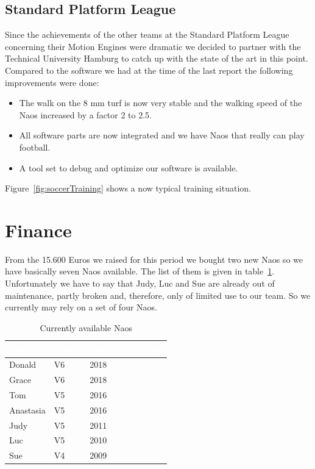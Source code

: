 \documentclass[11pt]{article}
\begin{document}
\subsection{Standard Platform League}\label{sec:spl}
Since the achievements of the other teams at the Standard Platform League concerning their Motion Engines were dramatic we decided to partner with the Technical University Hamburg to catch up with the state of the art in this point. Compared to the software we had at the time of the last report the following improvements were done:

\begin{itemize}
	\item The walk on the 8 mm turf is now very stable and the walking speed of the Naos increased by a factor 2 to 2.5. 
	\item All software parts are now integrated and we have Naos that really can play football.
	\item A tool set to debug and optimize our software is available.
\end{itemize}
Figure~\ref{fig:soccerTraining} shows a now typical training situation.

\section{Finance}
From the 15.600 Euros we raised for this period we bought two new Naos so we have basically seven Naos available. The list of them is given in table~\ref{tab:naos}. Unfortunately we have to say that Judy, Luc and Sue are already out of maintenance, partly broken and, therefore, only of limited use to our team. So we currently may rely on a set of four Naos.

\begin{table}
\begin{center}
\begin{tabular}{|p{.3\linewidth}|p{.1\linewidth}|p{.2\linewidth}|}
\hline
\cellcolor{gray!100}\textcolor{white}{Name} & \cellcolor{gray!100}\textcolor{white}{Model} & \cellcolor{gray!100}\textcolor{white}{Year of Purchase} \\ \hline
Donald & V6 & 2018 \\ \hline
Grace & V6 & 2018 \\ \hline
Tom & V5 & 2016 \\ \hline
Anastasia & V5 & 2016 \\ \hline
Judy & V5 & 2011 \\ \hline
Luc & V5 & 2010 \\ \hline
Sue & V4 & 2009 \\ \hline
\end{tabular}
\end{center}
\caption{Currently available Naos}
\label{tab:naos}
\end{table}
\end{document}
